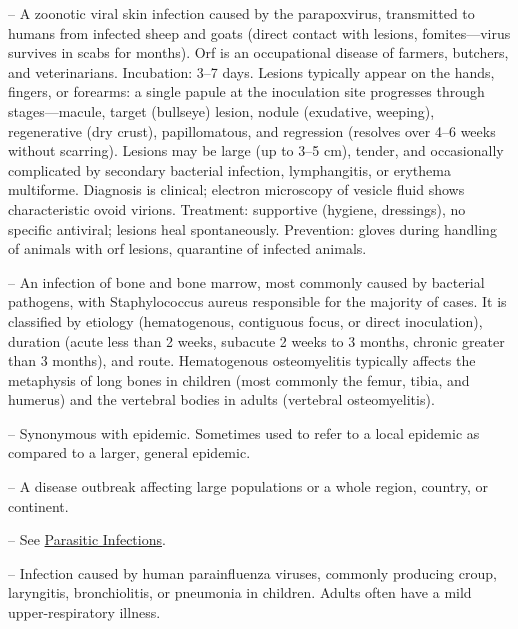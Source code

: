 -- A zoonotic viral skin infection caused by the parapoxvirus, transmitted to humans from infected sheep and goats (direct contact with lesions, fomites—virus survives in scabs for months). Orf is an occupational disease of farmers, butchers, and veterinarians. Incubation: 3--7 days. Lesions typically appear on the hands, fingers, or forearms: a single papule at the inoculation site progresses through stages—macule, target (bullseye) lesion, nodule (exudative, weeping), regenerative (dry crust), papillomatous, and regression (resolves over 4--6 weeks without scarring). Lesions may be large (up to 3--5 cm), tender, and occasionally complicated by secondary bacterial infection, lymphangitis, or erythema multiforme. Diagnosis is clinical; electron microscopy of vesicle fluid shows characteristic ovoid virions. Treatment: supportive (hygiene, dressings), no specific antiviral; lesions heal spontaneously. Prevention: gloves during handling of animals with orf lesions, quarantine of infected animals.

-- An infection of bone and bone marrow, most commonly caused by bacterial pathogens, with Staphylococcus aureus responsible for the majority of cases. It is classified by etiology (hematogenous, contiguous focus, or direct inoculation), duration (acute less than 2 weeks, subacute 2 weeks to 3 months, chronic greater than 3 months), and route. Hematogenous osteomyelitis typically affects the metaphysis of long bones in children (most commonly the femur, tibia, and humerus) and the vertebral bodies in adults (vertebral osteomyelitis).

-- Synonymous with epidemic. Sometimes used to refer to a local epidemic as compared to a larger, general epidemic.

-- A disease outbreak affecting large populations or a whole region, country, or continent.

-- See \hyperlink{Parasitic Infections}{Parasitic Infections}.

-- Infection caused by human parainfluenza viruses, commonly producing croup, laryngitis, bronchiolitis, or pneumonia in children. Adults often have a mild upper-respiratory illness.

